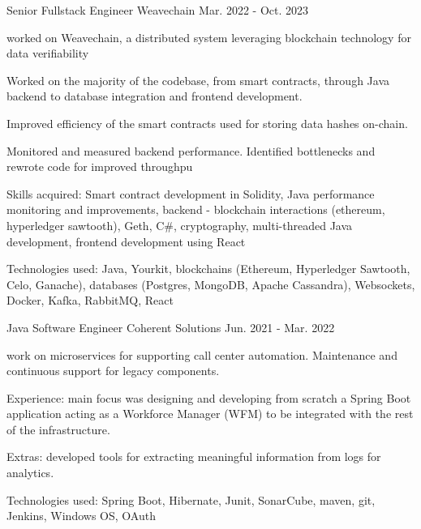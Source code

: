 \begin{cventries}
  \cventry
    {Senior Fullstack Engineer} %
    {Weavechain} %
    {} %
    {Mar. 2022 - Oct. 2023} %
    {
      \begin{cvitems} %
        \item {worked on Weavechain, a distributed system leveraging blockchain technology for data verifiability}
        \item {Worked on the majority of the codebase, from smart contracts, through Java backend to database integration and frontend development.}
        \item {Improved efficiency of the smart contracts used for storing data hashes on-chain.}
        \item {Monitored and measured backend performance. Identified bottlenecks and rewrote code for improved throughpu}
        \item {Skills acquired: Smart contract development in Solidity, Java performance monitoring and improvements, backend - blockchain interactions (ethereum, hyperledger sawtooth), Geth, C\#, cryptography, multi-threaded Java development, frontend development using React}
        \item {Technologies used: Java, Yourkit, blockchains (Ethereum, Hyperledger Sawtooth, Celo, Ganache), databases (Postgres, MongoDB, Apache Cassandra), Websockets, Docker, Kafka, RabbitMQ, React}
      \end{cvitems}
    }

\cventry
    {Java Software Engineer} %
    {Coherent Solutions} %
    {} %
    {Jun. 2021 - Mar. 2022} %
    {
      \begin{cvitems} %
        \item {work on microservices for supporting call center automation. Maintenance and continuous support for legacy components.}
        \item {Experience: main focus was designing and developing from scratch a Spring Boot application acting as a Workforce Manager (WFM) to be integrated with the rest of the infrastructure.}
        \item {Extras: developed tools for extracting meaningful information from logs for analytics.}
        \item {Technologies used: Spring Boot, Hibernate, Junit, SonarCube, maven, git, Jenkins, Windows OS, OAuth}
      \end{cvitems}
    }


\end{cventries}
